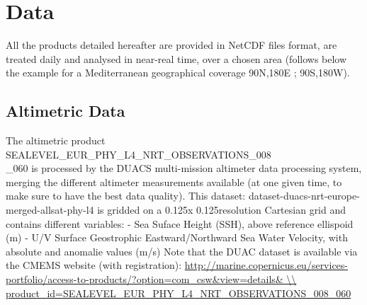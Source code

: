 \documentclass[12pt,a4paper]{article}
\begin{document}
\section{Data}
All the products detailed hereafter are provided in NetCDF files format, are treated daily and analysed in near-real time, over a chosen area (follows below the example for a Mediterranean geographical coverage 90\degre N,180\degre E ; 90\degre S,180\degre W).
\subsection{Altimetric Data}
The altimetric product SEALEVEL\_EUR\_PHY\_L4\_NRT\_OBSERVATIONS\_008 \\ \_060 is processed by the DUACS multi-mission altimeter data processing system, merging the different altimeter measurements available (at one given time, to make sure to have the best data quality). \newline 
This dataset: dataset-duacs-nrt-europe-merged-allsat-phy-l4 is gridded on a 0.125\degre x 0.125\degre resolution Cartesian grid and contains different variables: \newline
- Sea Suface Height (SSH), above reference ellispoid (m) \newline
- U/V Surface Geostrophic Eastward/Northward Sea Water Velocity, with absolute and anomalie values (m/s) \newline 
Note that the DUAC dataset is available via the CMEMS website  (with 
registration): \url{http://marine.copernicus.eu/services-portfolio/access-to-products/?option=com_csw&view=details& \\ product_id=SEALEVEL\_EUR\_PHY\_L4\_NRT\_OBSERVATIONS\_008\_060} 

\end{document}
